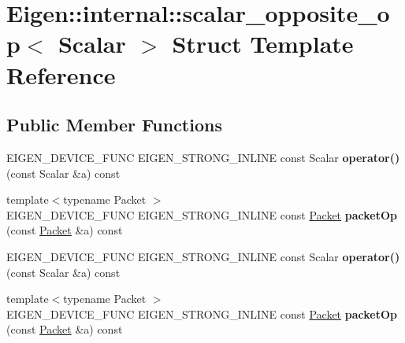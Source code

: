 \hypertarget{struct_eigen_1_1internal_1_1scalar__opposite__op}{}\section{Eigen\+:\+:internal\+:\+:scalar\+\_\+opposite\+\_\+op$<$ Scalar $>$ Struct Template Reference}
\label{struct_eigen_1_1internal_1_1scalar__opposite__op}
\subsection*{Public Member Functions}
\begin{DoxyCompactItemize}
\item 
\mbox{\label{struct_eigen_1_1internal_1_1scalar__opposite__op_ae5f9a5f4b661f02f01cf88b30ed24695}} 
E\+I\+G\+E\+N\+\_\+\+D\+E\+V\+I\+C\+E\+\_\+\+F\+U\+NC E\+I\+G\+E\+N\+\_\+\+S\+T\+R\+O\+N\+G\+\_\+\+I\+N\+L\+I\+NE const Scalar {\bfseries operator()} (const Scalar \&a) const
\item 
\mbox{\label{struct_eigen_1_1internal_1_1scalar__opposite__op_a2ad34e316a311a4f94a2e0493033acbc}} 
{\footnotesize template$<$typename Packet $>$ }\\E\+I\+G\+E\+N\+\_\+\+D\+E\+V\+I\+C\+E\+\_\+\+F\+U\+NC E\+I\+G\+E\+N\+\_\+\+S\+T\+R\+O\+N\+G\+\_\+\+I\+N\+L\+I\+NE const \hyperlink{union_eigen_1_1internal_1_1_packet}{Packet} {\bfseries packet\+Op} (const \hyperlink{union_eigen_1_1internal_1_1_packet}{Packet} \&a) const
\item 
\mbox{\label{struct_eigen_1_1internal_1_1scalar__opposite__op_ae5f9a5f4b661f02f01cf88b30ed24695}} 
E\+I\+G\+E\+N\+\_\+\+D\+E\+V\+I\+C\+E\+\_\+\+F\+U\+NC E\+I\+G\+E\+N\+\_\+\+S\+T\+R\+O\+N\+G\+\_\+\+I\+N\+L\+I\+NE const Scalar {\bfseries operator()} (const Scalar \&a) const
\item 
\mbox{\label{struct_eigen_1_1internal_1_1scalar__opposite__op_a2ad34e316a311a4f94a2e0493033acbc}} 
{\footnotesize template$<$typename Packet $>$ }\\E\+I\+G\+E\+N\+\_\+\+D\+E\+V\+I\+C\+E\+\_\+\+F\+U\+NC E\+I\+G\+E\+N\+\_\+\+S\+T\+R\+O\+N\+G\+\_\+\+I\+N\+L\+I\+NE const \hyperlink{union_eigen_1_1internal_1_1_packet}{Packet} {\bfseries packet\+Op} (const \hyperlink{union_eigen_1_1internal_1_1_packet}{Packet} \&a) const
\end{DoxyCompactItemize}



